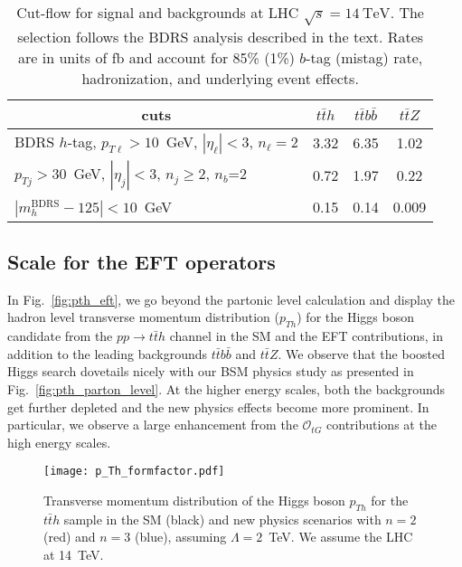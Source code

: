\documentclass[reprint, aps,prd, preprintnumbers,groupedaddress,nofootinbib]{revtex4-1}
\begin{document}
\begin{table}[h!]
\centering
\begin{tabular}{l | c  | c | c  }
  \multicolumn{1}{c|}{cuts} &
  \multicolumn{1}{c|}{$t\bar{t}h$}&
  \multicolumn{1}{c|}{$t\bar{t}b\bar{b}$} &
  \multicolumn{1}{c}{$t\bar{t}Z$}
   \\
  \hline
BDRS $h$-tag, $p_{T\ell}>10$~GeV,  $|\eta_\ell|<3$, $n_\ell= 2$ & 3.32 &  6.35 & 1.02 \\ 
$p_{Tj}>30$~GeV,  $|\eta_j|<3$, $n_j\ge 2$, $n_b$=2 & 0.72 &  1.97 & 0.22 \\ 
$|m_{h}^{\text{BDRS}}-125|<10$~GeV  & 0.15 & 0.14 & 0.009 \\ 
\end{tabular} 
\caption{Cut-flow for signal and backgrounds at LHC ${\sqrt{s}=14~\text{TeV}}$. The selection follows the BDRS analysis described in the text. Rates are in units of fb and account for  85\% (1\%) $b$-tag (mistag) rate, hadronization, and underlying event effects. }
\label{tab:cut_flow}
\end{table}

\subsection{Scale for the EFT operators}
\label{sec:ReachEFT}

In Fig.~\ref{fig:pth_eft}, we go beyond the partonic level calculation and display the hadron level transverse momentum distribution ($p_{Th}$) for the Higgs boson candidate from the $pp\to t\bar{t}h$ channel in the SM and the EFT contributions, in addition to the leading backgrounds $t\bar{t}b\bar{b}$ and $t\bar{t}Z$. We observe that the boosted Higgs search dovetails nicely with our BSM physics study as presented in Fig.~\ref{fig:pth_parton_level}. At the higher energy scales, both the backgrounds get further depleted and the new physics effects become more prominent. In particular, we observe a large enhancement from the $\mathcal{O}_{tG}$ contributions at the high energy scales.

\begin{figure}[b!]
    \centering
    \texttt{[image: p\_Th\_formfactor.pdf]}
        \caption{Transverse momentum distribution of the Higgs boson $p_{Th}$ for the  $t\bar{t}h$ sample in the SM (black) and new physics scenarios with $n=2$ (red) and $n=3$ (blue), assuming $\Lambda=2$~TeV. We assume the LHC at 14~TeV.}
    \label{fig:pth_form}
\end{figure}
\end{document}
